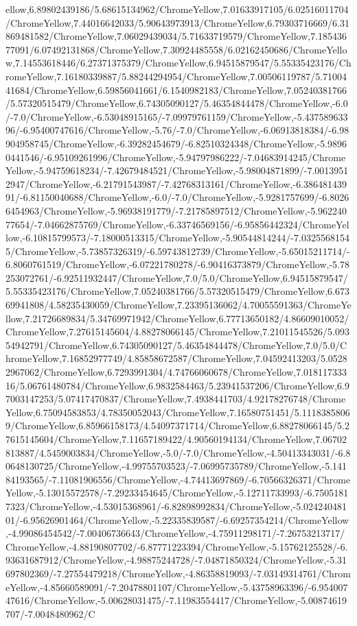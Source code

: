 {\begin{tikzternal}
ellow,6.89802439186/5.68615134962/ChromeYellow,7.01633917105/6.02516011704/ChromeYellow,7.44016642033/5.90643973913/ChromeYellow,6.79303716669/6.31869481582/ChromeYellow,7.06029439034/5.71633719579/ChromeYellow,7.18543677091/6.07492131868/ChromeYellow,7.30924485558/6.02162450686/ChromeYellow,7.14553618446/6.27371375379/ChromeYellow,6.94515879547/5.55335423176/ChromeYellow,7.16180339887/5.88244294954/ChromeYellow,7.00506119787/5.7100441684/ChromeYellow,6.59856041661/6.1540982183/ChromeYellow,7.05240381766/5.57320515479/ChromeYellow,6.74305090127/5.46354844478/ChromeYellow,-6.0/-7.0/ChromeYellow,-6.53048915165/-7.09979761159/ChromeYellow,-5.43758963396/-6.95400747616/ChromeYellow,-5.76/-7.0/ChromeYellow,-6.06913818384/-6.98904958745/ChromeYellow,-6.39282454679/-6.82510324348/ChromeYellow,-5.98960441546/-6.95109261996/ChromeYellow,-5.94797986222/-7.04683914245/ChromeYellow,-5.94759618234/-7.42679484521/ChromeYellow,-5.98004871899/-7.00139512947/ChromeYellow,-6.21791543987/-7.42768313161/ChromeYellow,-6.38648143991/-6.81150040688/ChromeYellow,-6.0/-7.0/ChromeYellow,-5.9281757699/-6.80266454963/ChromeYellow,-5.96938191779/-7.21785897512/ChromeYellow,-5.96224077654/-7.04662875769/ChromeYellow,-6.33746569156/-6.95856442324/ChromeYellow,-6.10815799573/-7.18000513315/ChromeYellow,-5.90544814244/-7.03255681545/ChromeYellow,-5.73857326319/-6.59743812739/ChromeYellow,-5.65015211714/-6.8060761519/ChromeYellow,-6.07221780278/-6.90416373879/ChromeYellow,-5.78253072761/-6.92511932447/ChromeYellow,7.0/5.0/ChromeYellow,6.94515879547/5.55335423176/ChromeYellow,7.05240381766/5.57320515479/ChromeYellow,6.67369941808/4.58235430059/ChromeYellow,7.23395136062/4.70055591363/ChromeYellow,7.21726689834/5.34769971942/ChromeYellow,6.77713650182/4.86609010052/ChromeYellow,7.27615145604/4.88278066145/ChromeYellow,7.21011545526/5.09354942791/ChromeYellow,6.74305090127/5.46354844478/ChromeYellow,7.0/5.0/ChromeYellow,7.16852977749/4.85858672587/ChromeYellow,7.04592413203/5.05282967062/ChromeYellow,6.7293991304/4.74766060678/ChromeYellow,7.01811733316/5.06761480784/ChromeYellow,6.9832584463/5.23941537206/ChromeYellow,6.97003147253/5.07417470837/ChromeYellow,7.4938441703/4.92178276748/ChromeYellow,6.75094583853/4.78350052043/ChromeYellow,7.16580751451/5.11183858069/ChromeYellow,6.85966158173/4.54097371714/ChromeYellow,6.88278066145/5.27615145604/ChromeYellow,7.11657189422/4.90560194134/ChromeYellow,7.06702813887/4.5459003834/ChromeYellow,-5.0/-7.0/ChromeYellow,-4.50413343031/-6.80648130725/ChromeYellow,-4.99755703523/-7.06995735789/ChromeYellow,-5.14184193565/-7.11081906556/ChromeYellow,-4.74413697869/-6.70566326371/ChromeYellow,-5.13015572578/-7.29233454645/ChromeYellow,-5.12711733993/-6.75051817323/ChromeYellow,-4.53015368961/-6.82898992834/ChromeYellow,-5.02424048101/-6.95626901464/ChromeYellow,-5.22335839587/-6.69257354214/ChromeYellow,-4.99086454542/-7.00406736643/ChromeYellow,-4.75911298171/-7.26753213717/ChromeYellow,-4.88190807702/-6.87771223394/ChromeYellow,-5.15762125528/-6.93631687912/ChromeYellow,-4.98875244728/-7.04871850324/ChromeYellow,-5.31697802369/-7.27554479218/ChromeYellow,-4.86358819093/-7.03149314761/ChromeYellow,-4.85660589091/-7.20478801107/ChromeYellow,-5.43758963396/-6.95400747616/ChromeYellow,-5.00628031475/-7.11983554417/ChromeYellow,-5.00874619707/-7.0048480962/C
\end{tikzternal}}
